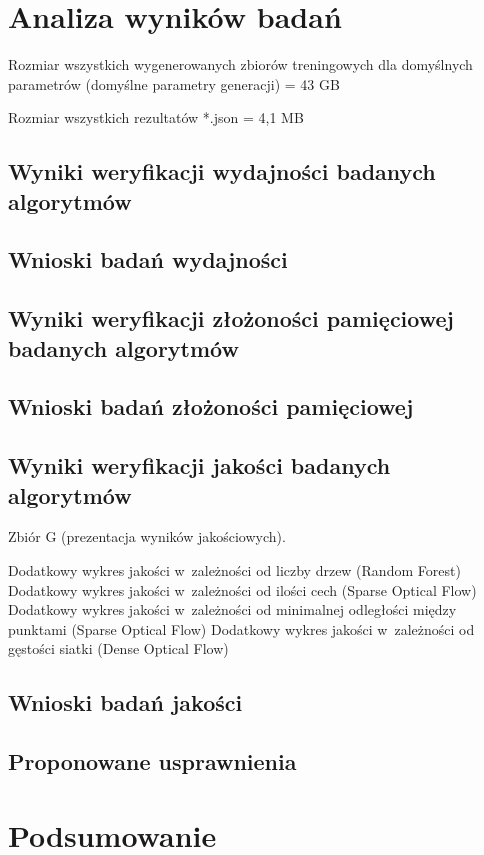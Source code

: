 \chapter{Analiza wyników badań}\label{Chapter_AnalizaRezultatow}

  Rozmiar wszystkich wygenerowanych zbiorów treningowych dla domyślnych parametrów (domyślne parametry generacji) = 43 GB

  Rozmiar wszystkich rezultatów *.json = 4,1 MB

  \section{Wyniki weryfikacji wydajności badanych algorytmów}\label{Section_Performance}

  \section{Wnioski badań wydajności}\label{Section_PerformanceWnioski}

  \section{Wyniki weryfikacji złożoności pamięciowej badanych algorytmów}\label{Section_MemoryPerformance}

  \section{Wnioski badań złożoności pamięciowej}\label{Section_MemoryPerformanceWnioski}

  \section{Wyniki weryfikacji jakości badanych algorytmów}\label{Section_Quality}

  Zbiór G (prezentacja wyników jakościowych).

  Dodatkowy wykres jakości w~zależności od liczby drzew (Random Forest)
  Dodatkowy wykres jakości w~zależności od ilości cech (Sparse Optical Flow)
  Dodatkowy wykres jakości w~zależności od minimalnej odległości między punktami (Sparse Optical Flow)
  Dodatkowy wykres jakości w~zależności od gęstości siatki (Dense Optical Flow)

  \section{Wnioski badań jakości}\label{Section_QualityWnioski}

  \section{Proponowane usprawnienia}\label{Section_Usprawnienia}

\chapter{Podsumowanie}\label{Section_Podsumowanie}